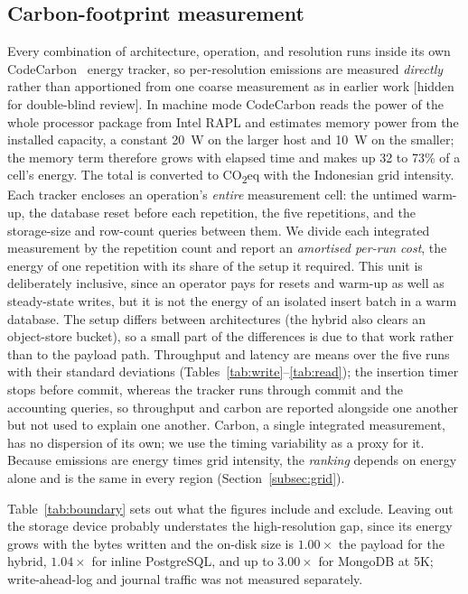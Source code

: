 \documentclass[pdflatex,sn-basic]{sn-jnl}%
\begin{document}
\subsection{Carbon-footprint measurement}\label{subsec:carbon_method}
{\color{markup}Every combination of architecture, operation, and resolution runs inside its own CodeCarbon~\citep{codecarbon} energy tracker, so per-resolution emissions are measured \emph{directly} rather than apportioned from one coarse measurement as in earlier work [hidden for double-blind review].} {\color{markup}In machine mode CodeCarbon reads the power of the whole processor package from Intel RAPL and estimates memory power from the installed capacity, a constant 20~W on the larger host and 10~W on the smaller; the memory term therefore grows with elapsed time and makes up 32 to 73\% of a cell's energy.} {\color{markup}The total is converted to CO\textsubscript{2}eq with the Indonesian grid intensity.} {\color{markup}Each tracker encloses an operation's \emph{entire} measurement cell: the untimed warm-up, the database reset before each repetition, the five repetitions, and the storage-size and row-count queries between them.} {\color{markup}We divide each integrated measurement by the repetition count and report an \emph{amortised per-run cost}, the energy of one repetition with its share of the setup it required.} {\color{markup}This unit is deliberately inclusive, since an operator pays for resets and warm-up as well as steady-state writes, but it is not the energy of an isolated insert batch in a warm database.} {\color{markup}The setup differs between architectures (the hybrid also clears an object-store bucket), so a small part of the differences is due to that work rather than to the payload path.} {\color{markup}Throughput and latency are means over the five runs with their standard deviations (Tables~\ref{tab:write}--\ref{tab:read}); the insertion timer stops before commit, whereas the tracker runs through commit and the accounting queries, so throughput and carbon are reported alongside one another but not used to explain one another.} {\color{markup}Carbon, a single integrated measurement, has no dispersion of its own; we use the timing variability as a proxy for it.} {\color{markup}Because emissions are energy times grid intensity, the \emph{ranking} depends on energy alone and is the same in every region (Section~\ref{subsec:grid}).}

{\color{markup}Table~\ref{tab:boundary} sets out what the figures include and exclude.} {\color{markup}Leaving out the storage device probably understates the high-resolution gap, since its energy grows with the bytes written and the on-disk size is $1.00\times$ the payload for the hybrid, $1.04\times$ for inline PostgreSQL, and up to $3.00\times$ for MongoDB at 5K; write-ahead-log and journal traffic was not measured separately.}
\end{document}
